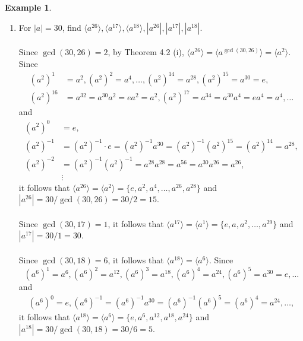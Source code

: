 \documentclass{article}
\theoremstyle{definition}
\newtheorem{example}{Example}[section]
\begin{document}
\begin{example}
    \begin{enumerate}
        \item For $|a|=30$, find $\langle a^{26} \rangle, \langle a^{17} \rangle, \langle a^{18} \rangle, |a^{26}|, |a^{17}|, |a^{18}|$.
        \\ \\
        Since $\gcd(30,26)=2$, by Theorem 4.2 (i), $\langle a^{26} \rangle = \langle a^{\gcd(30,26)} \rangle = \langle a^2 \rangle$.
        Since
        \begin{align*}
            (a^2)^1 &= a^2, (a^2)^2=a^4, \dots, (a^2)^{14}=a^{28}, (a^2)^{15}=a^{30}=e, \\ (a^2)^{16} &= a^{32}=a^{30}a^{2}=ea^{2}=a^{2}, (a^2)^{17} = a^{34}=a^{30}a^{4}=ea^{4}=a^{4}, \dots
        \end{align*}
        and
        \begin{align*}
            (a^2)^0 &= e, \\
            (a^2)^{-1} &= (a^2)^{-1}\cdot e = (a^2)^{-1}a^{30} = (a^2)^{-1}(a^2)^{15} = (a^2)^14 = a^{28}, \\
            (a^2)^{-2} &= (a^2)^{-1}(a^2)^{-1} = a^{28}a^{28} = a^{56} = a^{30}a^{26} = a^{26}, \\
            & \vdots
        \end{align*}
        it follows that $\langle a^{26} \rangle = \langle a^2 \rangle = \{e,a^2,a^4,\dots,a^{26},a^{28}\}$ and $|a^{26}|=30/\gcd(30,26)=30/2=15$.
        \\ \\
        Since $\gcd(30,17)=1$, it follows that $\langle a^{17} \rangle = \langle a^1 \rangle = \{e,a,a^2,\dots,a^{29}\}$ and $|a^{17}|=30/1=30$.
        \\ \\
        Since $\gcd(30,18)=6$, it follows that $\langle a^{18} \rangle = \langle a^6 \rangle$. Since
        \begin{equation*}
            (a^6)^1=a^6, (a^6)^2=a^{12}, (a^6)^3=a^{18}, (a^6)^4=a^{24}, (a^6)^5=a^{30}=e, \dots
        \end{equation*}
        and
        \begin{align*}
            (a^6)^0=e, (a^6)^{-1} = (a^6)^{-1}a^{30} = (a^6)^{-1}(a^6)^5 = (a^6)^4 = a^{24}, \dots,
        \end{align*}
        it follows that $\langle a^18 \rangle = \langle a^6 \rangle = \{e,a^6,a^{12},a^{18},a^{24}\}$ and $|a^{18}|=30/\gcd(30,18)=30/6=5$.
        

\end{enumerate}
\end{example}
\end{document}

